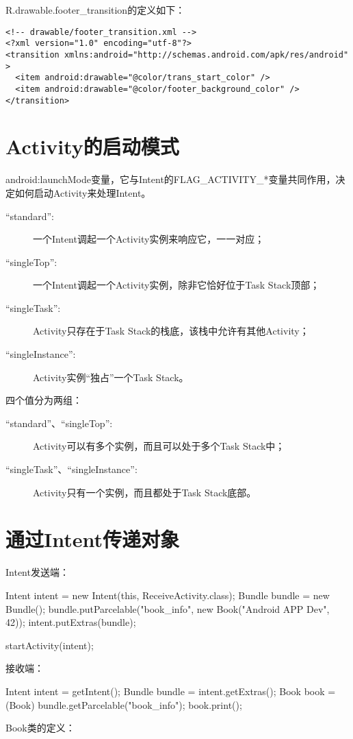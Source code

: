 R.drawable.footer\_transition的定义如下：

\begin{verbatim}
<!-- drawable/footer_transition.xml -->
<?xml version="1.0" encoding="utf-8"?>
<transition xmlns:android="http://schemas.android.com/apk/res/android" >
  <item android:drawable="@color/trans_start_color" />
  <item android:drawable="@color/footer_background_color" />
</transition>
\end{verbatim}


\section[Activity的启动模式]{Activity的启动模式}
android:launchMode变量，它与Intent的FLAG\_ACTIVITY\_*变量共同作用，决定如何启动Activity来处理Intent。

\begin{description}
  \item[``standard'':] 一个Intent调起一个Activity实例来响应它，一一对应；
  \item[``singleTop'':] 一个Intent调起一个Activity实例，除非它恰好位于Task Stack顶部；
  \item[``singleTask'':] Activity只存在于Task Stack的栈底，该栈中允许有其他Activity；
  \item[``singleInstance'':] Activity实例“独占”一个Task Stack。
\end{description}

四个值分为两组：

\begin{description}
  \item[``standard''、``singleTop'':] Activity可以有多个实例，而且可以处于多个Task Stack中；
  \item[``singleTask''、``singleInstance'':] Activity只有一个实例，而且都处于Task Stack底部。
\end{description}


\section[通过Intent传递对象]{通过Intent传递对象}
Intent发送端：\par
\begin{javacode}
Intent intent = new Intent(this, ReceiveActivity.class);
Bundle bundle = new Bundle();
bundle.putParcelable("book_info", new Book("Android APP Dev", 42));
intent.putExtras(bundle);

startActivity(intent);
\end{javacode}

接收端：\par
\begin{javacode}
Intent intent = getIntent();
Bundle bundle = intent.getExtras();
Book book = (Book) bundle.getParcelable("book_info");
book.print();
\end{javacode}

Book类的定义：\par
\inputminted[linenos,tabsize=4,bgcolor=srcbg]{java}{srcdir/ParcableBook.java}